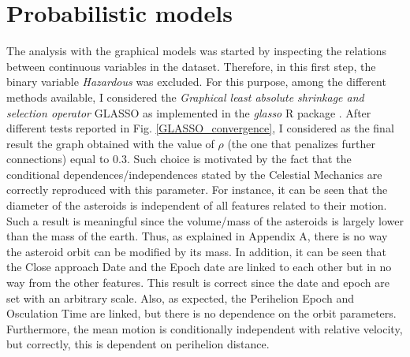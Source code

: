 \documentclass[12pt,%
               a4paper,%
               oneside,openany,%
               titlepage,%
               headinclude,footinclude,%
               BCOR5mm,%
               cleardoublepage=empty,%
               tablecaptionabove,%
               floatperchapter,
               ]{scrreprt}                 %
\begin{document}
\pagebreak

\section{Probabilistic models} The analysis with the graphical models was started by inspecting the relations between continuous variables in the dataset. Therefore, in this first step, the binary variable \textit{Hazardous} was excluded. For this purpose, among the different methods available, I considered the \textit{Graphical least absolute shrinkage and selection operator} GLASSO as implemented in the \textit{glasso} R package \cite{friedman2008sparse,glasso}. After different tests reported in Fig. \ref{GLASSO_convergence}, I considered as the final result the graph obtained with the value of $\rho$ (the one that penalizes further connections) equal to $0.3$. Such choice is motivated by the fact that the conditional dependences/independences stated by the Celestial Mechanics are correctly reproduced with this parameter. For instance, it can be seen that the diameter of the asteroids is independent of all features related to their motion. Such a result is meaningful since the volume/mass of the asteroids is largely lower than the mass of the earth.  Thus, as explained in Appendix A, there is no way the asteroid orbit can be modified by its mass. In addition, it can be seen that the Close approach Date and the Epoch date are linked to each other but in no way from the other features. This result is correct since the date and epoch are set with an arbitrary scale. Also, as expected, the Perihelion Epoch and Osculation Time are linked, but there is no dependence on the orbit parameters. Furthermore, the mean motion is conditionally independent with relative velocity, but correctly, this is dependent on perihelion distance.
\end{document}
